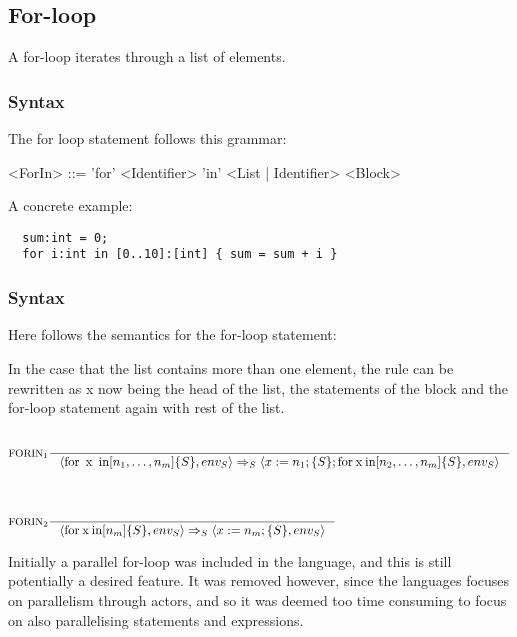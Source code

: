 \subsection{For-loop}
\label{subsec:forLoopStatements}

A for-loop iterates through a list of elements.

\subsubsection{Syntax}

The for loop statement follows this grammar:

\begin{grammar}
<ForIn> ::= 'for' <Identifier> 'in' <List | Identifier> <Block>
\end{grammar}

A concrete example:

\begin{verbatim}
  sum:int = 0;
  for i:int in [0..10]:[int] { sum = sum + i }
\end{verbatim}


\subsubsection{Syntax}

Here follows the semantics for the for-loop statement:

In the case that the list contains more than one element, the rule can be rewritten as x now being the head of the list, the statements of the block and the for-loop statement again with rest of the list.

\begin{align*}
\intertext{}
&\inference[$\text{FORIN}_{1}$]{}
                       {\Braket{\Tfor \Tx \Tin [n_1,\dots,n_m]\{S\},env_S} \Rightarrow_S \Braket{x := n_1;\{S\}; \Tfor \mathbin{\text{x}} \mathbin{\text{in}} [n_2,\dots,n_m]\{S\},env_S}}
\\\\
\intertext{}
&\inference[$\text{FORIN}_{2}$]{}
                       {\Braket{\Tfor \mathbin{\text{x}}\mathbin{\text{in}} [n_m]\{S\},env_S} \Rightarrow_S \Braket{x := n_m;\{S\},env_S}}
\end{align*}

Initially a parallel for-loop was included in the language, and this is still potentially a desired feature. It was removed however, since the languages focuses on parallelism through actors, and so it was deemed too time consuming to focus on also parallelising statements and expressions.

